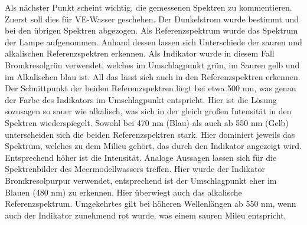 \documentclass[12pt]{article}
\begin{document}
Als nächster Punkt scheint wichtig, die gemessenen Spektren zu kommentieren. Zuerst soll dies für VE-Wasser geschehen. Der Dunkelstrom wurde bestimmt und bei den übrigen Spektren abgezogen. Als Referenzspektrum wurde das Spektrum der Lampe aufgenommen. Anhand dessen lassen sich Unterschiede der sauren und alkalischen Referenzspektren erkennen. Als Indikator wurde in diesem Fall Bromkresolgrün verwendet, welches im Umschlagpunkt grün, im Sauren gelb und im Alkalischen blau ist. All das lässt sich auch in den Referenzspektren erkennen. Der Schnittpunkt der beiden Referenzspektren liegt bei etwa 500 nm, was genau der Farbe des Indikators im Umschlagpunkt entspricht. Hier ist die Lösung sozusagen so sauer wie alkalisch, was sich in der gleich großen Intensität in den Spektren wiederspiegelt. Sowohl bei 470 nm (Blau) als auch ab 550 nm (Gelb) unterscheiden sich die beiden Referenzspektren stark. Hier dominiert jeweils das Spektrum, welches zu dem Milieu gehört, das durch den Indikator angezeigt wird. Entsprechend höher ist die Intensität.
Analoge Aussagen lassen sich für die Spektrenbilder des Meermodellwassers treffen. Hier wurde der Indikator Bromkresolpurpur verwendet, entsprechend ist der Umschlagpunkt eher im Blauen (480 nm) zu erkennen. Hier überwiegt auch das alkalische Referenzspektrum. Umgekehrtes gilt bei höheren Wellenlängen ab 550 nm, wenn auch der Indikator zunehmend rot wurde, was einem sauren Mileu entspricht.
\end{document}
